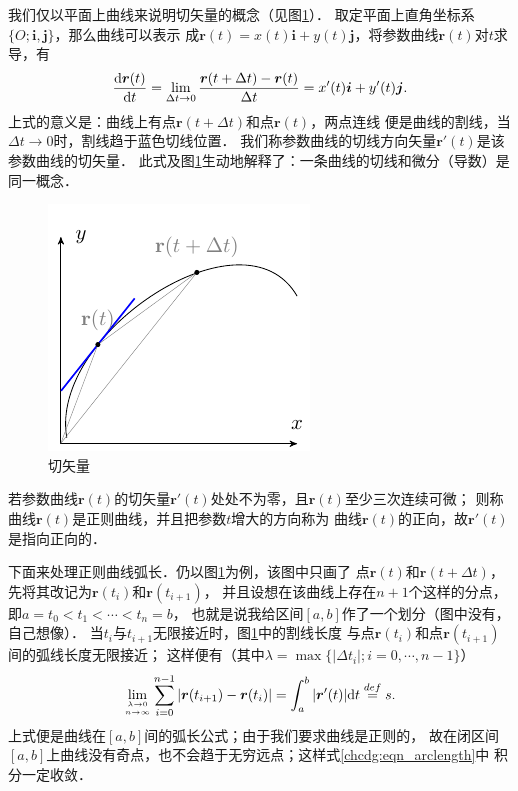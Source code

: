 我们仅以平面上曲线来说明切矢量的概念（见图\ref{chcdg:pic_tangent}）．
取定平面上直角坐标系$\{O;\boldsymbol{i},\boldsymbol{j}\}$，那么曲线可以表示
成$\boldsymbol{r}(t)=x(t)\boldsymbol{i}+y(t)\boldsymbol{j}$，将参数曲线$\boldsymbol{r}(t)$对$t$求导，有
\begin{equation}
    \frac{{\rm d}\boldsymbol{r}(t)}{{\rm d}t}=\lim_{\Delta t\to 0}
    \frac{\boldsymbol{r}(t+\Delta t)-\boldsymbol{r}(t)}{\Delta t}=
    x'(t)\boldsymbol{i} + y'(t)\boldsymbol{j} .
\end{equation}
上式的意义是：曲线上有点$\boldsymbol{r}(t+\Delta t)$和点$\boldsymbol{r}(t)$，两点连线
便是曲线的割线，当$\Delta t\to 0$时，割线趋于蓝色切线位置．
我们称参数曲线的切线方向矢量$\boldsymbol{r}'(t)$是该参数曲线的{\heiti 切矢量}．
此式及图\ref{chcdg:pic_tangent}生动地解释了：一条曲线的切线和微分（导数）是同一概念．

\begin{figure}[htb]
    \centering
    \includegraphics{fig/ch1-tangent.pdf}
    \caption{切矢量}\label{chcdg:pic_tangent}
\end{figure}


若参数曲线$\boldsymbol{r}(t)$的切矢量$\boldsymbol{r}'(t)$处处不为零，且$\boldsymbol{r}(t)$至少三次连续可微；
则称曲线$\boldsymbol{r}(t)$是{\heiti 正则曲线}，并且把参数$t$增大的方向称为
曲线$\boldsymbol{r}(t)$的{\heiti 正向}，故$\boldsymbol{r}'(t)$是指向正向的．

下面来处理正则曲线弧长．仍以图\ref{chcdg:pic_tangent}为例，该图中只画了
点$\boldsymbol{r}(t)$和$\boldsymbol{r}(t+\Delta t)$，先将其改记为$\boldsymbol{r}(t_i)$和$\boldsymbol{r}(t_{i+1})$，
并且设想在该曲线上存在$n+1$个这样的分点，即$a=t_0<t_1<\cdots<t_n=b$，
也就是说我给区间$[a,b]$作了一个划分（图中没有，自己想像）．
当$t_i$与$t_{i+1}$无限接近时，图\ref{chcdg:pic_tangent}中的割线长度
与点$\boldsymbol{r}(t_i)$和点$\boldsymbol{r}(t_{i+1})$间的弧线长度无限接近；
这样便有（其中$\lambda = \max \{|\Delta t_i|; i=0,\cdots,n-1 \}$）
\begin{equation}\label{chcdg:eqn_arclength}
    \lim\limits_{\lambda\to 0 \atop n\to \infty } \sum_{i=0}^{n-1} 
    |\boldsymbol{r}(t_{i+1}) - \boldsymbol{r}(t_{i})| = \int_{a}^{b} |\boldsymbol{r}'(t)|{\rm d}t
    \overset{def}{=}s .
\end{equation}
上式便是曲线在$[a,b]$间的{\heiti 弧长公式}；由于我们要求曲线是正则的，
故在闭区间$[a,b]$上曲线没有奇点，也不会趋于无穷远点；这样式\eqref{chcdg:eqn_arclength}中
积分一定收敛．

